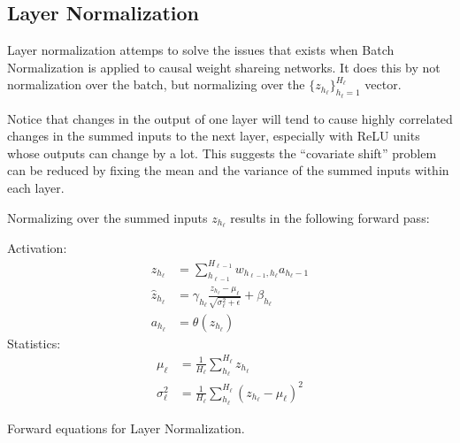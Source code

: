 \clearpage
\subsection{Layer Normalization}

Layer normalization attemps to solve the issues that exists when Batch Normalization is applied to causal weight shareing networks. It does this by not normalization over the batch, but normalizing over the $\{z_{h_\ell}\}_{h_\ell=1}^{H_\ell}$ vector. \cite{layer-normalization}

\begin{displayquote}
Notice that changes in the output of one layer will tend to cause highly correlated changes in the summed inputs to the next layer, especially with ReLU units whose outputs can change by a lot. This suggests the “covariate shift” problem can be reduced by fixing the mean and the variance of the summed inputs within each layer. 
\end{displayquote}

Normalizing over the summed inputs $z_{h_\ell}$ results in the following forward pass:
\begin{equationbox}[H]
Activation:
\begin{equation*}
\begin{aligned}
z_{h_\ell} &= \sum_{h_{\ell-1}}^{H_{\ell-1}} w_{h_{\ell-1},h_\ell} a_{h_\ell-1} \\
\hat{z}_{h_\ell} &= \gamma_{h_\ell} \frac{z_{h_\ell} - \mu_{\ell}}{\sqrt{\sigma_{\ell}^2 + \epsilon}} + \beta_{h_\ell} \\
a_{h_\ell} &= \theta\left(z_{h_\ell}\right)
\end{aligned}
\end{equation*}
Statistics:
\begin{equation*}
\begin{aligned}
\mu_{\ell} &= \frac{1}{H_\ell} \sum_{h_\ell}^{H_\ell} z_{h_\ell} \\
\sigma_{\ell}^2 &= \frac{1}{H_\ell} \sum_{h_\ell}^{H_\ell} (z_{h_\ell} - \mu_{\ell})^2
\end{aligned}
\end{equation*}
\caption{Forward equations for Layer Normalization.}
\end{equationbox}

